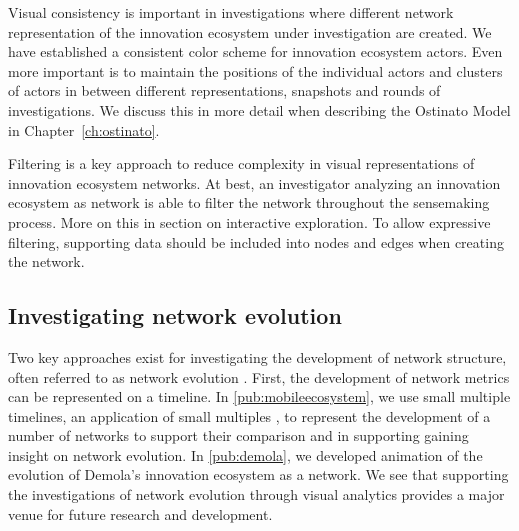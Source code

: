 Visual consistency is important in investigations where different network representation of the innovation ecosystem under investigation are created. We have established a consistent color scheme for innovation ecosystem actors. Even more important is to maintain the positions of the individual actors and clusters of actors in between different representations, snapshots and rounds of investigations. We discuss this in more detail when describing the Ostinato Model in Chapter~\ref{ch:ostinato}.

Filtering is a key approach to reduce complexity in visual representations of innovation ecosystem networks. At best, an  investigator analyzing an innovation ecosystem as network is able to filter the network throughout the sensemaking process. More on this in section on interactive exploration. To allow expressive filtering, supporting data should be included into nodes and edges when creating the network.  





\subsection{Investigating network evolution}

Two key approaches exist for investigating the development of network structure, often referred to as network evolution \citep[cf.][]{Ahuja2012TheNetworks}. First, the development of network metrics can be represented on a timeline. In \ref{pub:mobileecosystem}, we use small multiple timelines, an application of small multiples \citep{Heer2012InteractiveAnalysis,Tufte1983VisualInformation}, to represent the development of a number of networks to support their comparison and in supporting gaining insight on network evolution. In \ref{pub:demola}, we developed animation of the evolution of Demola's innovation ecosystem as a network. We see that supporting the investigations of network evolution through visual analytics provides a major venue for future research and development.

